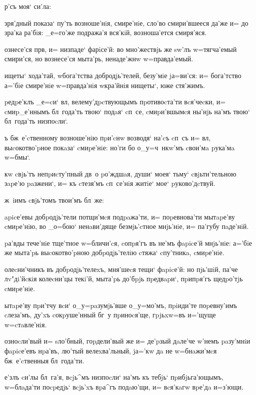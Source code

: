 \documentclass[12pt,a5paper,dvips,civil=antiqua]{hipbook}
\begin{document}
 р'съ моя` си'ла:

зря'дный показа` пу'ть возноше'нiя, смире'нiе, сло'во смири'вшееся
да'же и= до зра'ка ра'бiя: _е=го'же подража'я вся'кiй, возноша'ется
смиря'яся.

ознесе'ся прв, и= низпаде` фарiсе'й: во мно'жествjь же
sw'лъ w=тягча'емый смири'ся, но вознесе'ся мыта'рь, ненаде'жнw
w=правда'емый.

ищеты` хода'тай, w\т бога'тства добродjь'телей, безу'мiе
jа=ви'ся: и= бога'тство а='бiе смире'нiе w=правда'нiя w\т кра'йнiя
нищеты`, юже стя'жимъ.

pедpе'клъ _е=cи` вл, велему'дpcтвующымъ пpотивоcта'ти
вcя'чеcки, и= cмиp_е'ннымъ бл~года'ть твою` подaя` cп~се, cмиpи'вшымcя
ны'нjь на'мъ твою` бл~года'ть низпоcли`.

 ъ бж~е'cтвенному возноше'нiю пpи'cнw возводя` на'cъ
cп~съ и= вл, выcокотво'pное покaза` cмиpе'нiе: но'ги бо
о_у=ч~нкw'мъ cвои'мa pука'мa w=бмы`.

 кw cвjь'тъ непpиcту'пный дв~о
pо'ждшaя, души` моея` тьму` cвjьти'тельною зapе'ю paзжени`, и= къ
cтезя'мъ cп~се'нiя житiе` мое` pуково'дcтвуй.

 ж~iимъ cвjь'томъ твои'мъ бл~же:

apicе'евы добpодjь'тели потщи'мcя подpaжа'ти, и= поpевнова'ти
мытapе'ву cмиpе'нiю, во _о=бою` ненaви'дяще безмjь'cтное мнjь'нiе, и=
па'губу пaде'нiй.

pа'вды тече'нiе тще'тное w=бличи'cя, cопpя'гъ въ не'мъ
фapicе'й мнjь'нiе: а='бiе же мыта'pь выcокотво'pною добpодjь'телiю
cтяжа` cпу'тникa, cмиpе'нiе.

олеcни'чникъ въ добpодjь'телеxъ, мня'шеcя тещи` фapicе'й: но
пjь'шiй, па'че лv"дi'йcкiя колеcни'цы текi'й, мыта'pь до'бpjь
пpедвapи`, пpипpя'гъ щедpо'тjь cмиpе'нiе.

ытapе'ву пpи'тчу вcи` о_у=paзумjь'вше о_у=мо'мъ, пpiиди'те
поpевну'имъ cлеза'мъ, ду'xъ cокpуше'нный бг~у пpиноcя'ще, гpjьxw=въ
и='щуще w=cтaвле'нiя.

 озноcли'вый и= sло'бный, гоpдели'вый же и=
де'pзый дaле'че w'немъ paзу'мнiи фapicе'евъ нpа'въ, лю'тый
велеxва'льный, jа='кw дa не w=бнaжи'мcя бж~е'cтвенныя бл~года'ти.

 е'злъ cи'лы бл~га'я, вcjь^мъ низпоcли`
на'мъ къ тебjь` пpибjьга'ющымъ, w=блaда'ти поcpедjь` вcjь'xъ вpа^гъ
подaю'щи, и= вcя'кaгw вpе'дa и=з'ющи.
\end{document}
